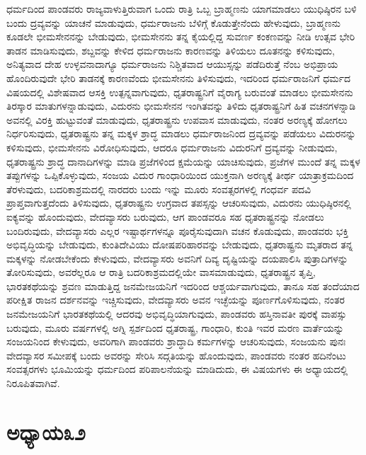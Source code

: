 ಧರ್ಮದಿಂದ ಪಾಂಡವರು ರಾಜ್ಯವಾಳುತ್ತಿರುವಾಗ ಒಂದು ರಾತ್ರಿ ಒಬ್ಬ ಬ್ರಾಹ್ಮಣನು ಯಾಗಮಾಡಲು ಯುಧಿಷ್ಠಿರನ ಬಳಿ ಬಂದು ದ್ರವ್ಯವನ್ನು ಯಾಚನೆ ಮಾಡುವುದು, ಧರ್ಮರಾಜನು ಬೆಳಿಗ್ಗೆ ಕೊಡುತ್ತೇನೆಂದು ಹೇಳುವುದು, ಬ್ರಾಹ್ಮಣನು ಕೂಡಲೇ ಭೀಮಸೇನನನ್ನು ಬೇಡುವುದು, ಭೀಮಸೇನನು ತನ್ನ ಕೈಯಲ್ಲಿದ್ದ ಸುವರ್ಣ ಕಂಕಣವನ್ನು ನೀಡಿ ಉತ್ಸವ ಭೇರಿ ತಾಡನ ಮಾಡಿಸುವುದು, ಶಬ್ದವನ್ನು ಕೇಳಿದ ಧರ್ಮರಾಜನು ಕಾರಣವನ್ನು ತಿಳಿಯಲು ದೂತನನ್ನು ಕಳಿಸುವುದು, ಅನಿತ್ಯವಾದ ದೇಹ ಉಳ್ಳವನಾದಾಗ್ಯೂ ಧರ್ಮರಾಜನು ನಿಶ್ಚಿತವಾದ ಆಯುಸ್ಸನ್ನು ಪಡೆದಿರುತ್ತೆ ನೆಂಬ ಅಭಿಪ್ರಾಯ ಹೊಂದಿರುವುದೇ ಭೇರಿ ತಾಡನಕ್ಕೆ ಕಾರಣವೆಂದು ಭೀಮಸೇನನು ತಿಳಿಸುವುದು, ಇದರಿಂದ ಧರ್ಮರಾಜನಿಗೆ ಧರ್ಮದ ವಿಷಯದಲ್ಲಿ ವಿಶೇಷವಾದ ಆಸಕ್ತಿ ಉತ್ಪನ್ನವಾಗುವುದು, ಧೃತರಾಷ್ಟ್ರನಿಗೆ ವೈರಾಗ್ಯ ಬರುವಂತೆ ಮಾಡಲು ಭೀಮಸೇನನು ತಿರಸ್ಕಾರ ಮಾತುಗಳನ್ನಾಡುವುದು, ವಿದುರನು ಭೀಮಸೇನನ ಇಂಗಿತವನ್ನು ತಿಳಿದು ಧೃತರಾಷ್ಟ್ರನಿಗೆ ಹಿತ ವಚನಗಳನ್ನಾಡಿ ಅವನಲ್ಲಿ ವಿರಕ್ತಿ ಹುಟ್ಟುವಂತೆ ಮಾಡುವುದು, ಧೃತರಾಷ್ಟ್ರನು ಉಪವಾಸ ಮಾಡುವುದು, ನಂತರ ಅರಣ್ಯಕ್ಕೆ ಹೋಗಲು ನಿರ್ಧರಿಸುವುದು, ಧೃತರಾಷ್ಟ್ರನು ತನ್ನ ಮಕ್ಕಳ ಶ್ರಾದ್ಧ ಮಾಡಲು ಧರ್ಮರಾಜನಿಂದ ದ್ರವ್ಯವನ್ನು ಪಡೆಯಲು ವಿದುರನನ್ನು ಕಳಿಸುವುದು, ಭೀಮಸೇನನು ವಿರೋಧಿಸುವುದು, ಆದರೂ ಧರ್ಮರಾಜನು ವಿದುರನಿಗೆ ದ್ರವ್ಯವನ್ನು ನೀಡುವುದು, ಧೃತರಾಷ್ಟ್ರನು ಶ್ರಾದ್ಧ ದಾನಾದಿಗಳನ್ನು ಮಾಡಿ ಪ್ರಜೆಗಳಿಂದ ಕ್ಷಮೆಯನ್ನು ಯಾಚಿಸುವುದು, ಪ್ರಜೆಗಳ ಮುಂದೆ ತನ್ನ ಮಕ್ಕಳ ತಪ್ಪುಗಳನ್ನು ಒಪ್ಪಿಕೊಳ್ಳುವುದು, ಸಂಜಯ ವಿದುರ ಗಾಂಧಾರಿಯಿಂದ ಯುಕ್ತನಾಗಿ ಅರಣ್ಯಕ್ಕೆ ತೀರ್ಥ ಯಾತ್ರಾಕ್ರಮದಿಂದ ತೆರಳುವುದು, ಬದರಿಕಾಶ್ರಮದಲ್ಲಿ ನಾರದರು ಬಂದು ಇನ್ನು ಮೂರು ಸಂವತ್ಸರಗಳಲ್ಲಿ ಗಂಧರ್ವ ಪದವಿ ಪ್ರಾಪ್ತವಾಗುತ್ತದೆಂದು ತಿಳಿಸುವುದು, ಧೃತರಾಷ್ಟ್ರನು ಉಗ್ರವಾದ ತಪಸ್ಸನ್ನು ಆಚರಿಸುವುದು, ವಿದುರನು ಯುಧಿಷ್ಠಿರನಲ್ಲಿ ಐಕ್ಯವನ್ನು ಹೊಂದುವುದು, ವೇದವ್ಯಾಸರು ಬರುವುದು, ಆಗ ಪಾಂಡವರೂ ಸಹ ಧೃತರಾಷ್ಟ್ರನನ್ನು ನೋಡಲು ಬಂದಿರುವುದು, ವೇದವ್ಯಾಸರು ಎಲ್ಲರ ಇಷ್ಟಾರ್ಥಗಳನ್ನೂ ಪೂರೈಸುವುದಾಗಿ ವಚನ ಕೊಡುವುದು, ಪಾಂಡವರು ಭಕ್ತಿ ಅಭಿವೃದ್ಧಿಯನ್ನು ಬೇಡುವುದು, ಕುಂತಿದೇವಿಯು ದೋಷಪರಿಹಾರವನ್ನು ಬೇಡುವುದು, ಧೃತರಾಷ್ಟ್ರನು ಮೃತರಾದ ತನ್ನ ಮಕ್ಕಳನ್ನು ನೋಡಬೇಕೆಂದು ಕೇಳುವುದು, ವೇದವ್ಯಾಸರು ಅವನಿಗೆ ದಿವ್ಯ ದೃಷ್ಟಿಯನ್ನು ದಯಪಾಲಿಸಿ ಪುತ್ರಾದಿಗಳನ್ನು ತೋರಿಸುವುದು, ಅವರೆಲ್ಲರೂ ಆ ರಾತ್ರಿ ಬದರಿಕಾಶ್ರಮದಲ್ಲಿಯೇ ವಾಸಮಾಡುವುದು, ಧೃತರಾಷ್ಟ್ರನ ತೃಪ್ತಿ, ಭಾರತಕಥೆಯನ್ನು ಶ್ರವಣ ಮಾಡುತ್ತಿದ್ದ ಜನಮೇಜಯನಿಗೆ ಇದರಿಂದ ಆಶ್ಚರ್ಯವಾಗುವುದು, ತಾನೂ ಸಹ ತಂದೆಯಾದ ಪರೀಕ್ಷಿತ ರಾಜನ ದರ್ಶನವನ್ನು ಇಚ್ಚಿಸುವುದು, ವೇದವ್ಯಾಸರು ಅವನ ಇಚ್ಛೆಯನ್ನು ಪೂರ್ಣಗೊಳಿಸುವುದು, ನಂತರ ಜನಮೇಜಯನಿಗೆ ಭಾರತಕಥೆಯಲ್ಲಿ ಆದರವು ಅಭಿವೃದ್ಧಿಯಾಗುವುದು, ಪಾಂಡವರು ಹಸ್ತಿನಾವತೀ ಪುರಕ್ಕೆ ವಾಪಸ್ಸು ಬರುವುದು, ಮೂರು ವರ್ಷಗಳಲ್ಲಿ ಅಗ್ನಿ ಸ್ಪರ್ಶದಿಂದ ಧೃತರಾಷ್ಟ್ರ, ಗಾಂಧಾರಿ, ಕುಂತಿ ಇವರ ಮರಣ ವಾರ್ತೆಯನ್ನು ಸಂಜಯನಿಂದ ಕೇಳುವುದು, ಅವರಿಗಾಗಿ ಪಾಂಡವರು ಶ್ರಾದ್ಧಾದಿ ಕರ್ಮಗಳನ್ನು ಆಚರಿಸುವುದು, ಸಂಜಯನು ಪುನಃ ವೇದವ್ಯಾಸರ ಸಮೀಪಕ್ಕೆ ಬಂದು ಅವರನ್ನು ಸೇರಿಸಿ ಸದ್ಗತಿಯನ್ನು ಹೊಂದುವುದು, ಪಾಂಡವರು ನಂತರ ಹದಿನೆಂಟು ಸಂವತ್ಸರಗಳು ಭೂಮಿಯನ್ನು ಧರ್ಮದಿಂದ ಪರಿಪಾಲನೆಯನ್ನು ಮಾಡಿದುದು, ಈ ವಿಷಯಗಳು ಈ ಅಧ್ಯಾಯದಲ್ಲಿ ನಿರೂಪಿತವಾಗಿವೆ.


\section*{ಅಧ್ಯಾಯ\enginline{-}೩೨}

